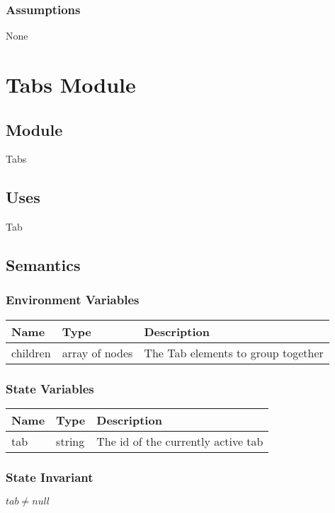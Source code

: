 \documentclass[12pt]{article}
\begin{document}
\subsubsection{Assumptions}
None

\newpage


\section{Tabs Module}

\subsection{Module}
Tabs

\subsection{Uses}
Tab

\subsection{Semantics}

\subsubsection{Environment Variables}
\begin{tabular}{| l | l | p{10cm} |}
    \hline
    \textbf{Name} & \textbf{Type} & \textbf{Description}\\ \hline
    children & array of nodes & The Tab elements to group together\\ \hline
\end{tabular}

\subsubsection{State Variables}
\begin{tabular}{| l | l | p{10cm} |}
    \hline
    \textbf{Name} & \textbf{Type} & \textbf{Description}\\ \hline
    tab & string & The id of the currently active tab\\ \hline
\end{tabular}

\subsubsection{State Invariant}
$tab \neq null$
\end{document}
